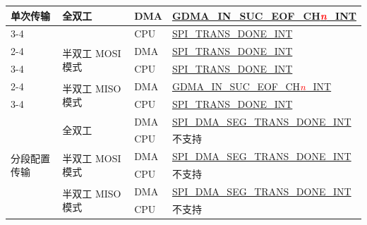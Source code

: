 \documentclass[main\_\_CN.tex]{subfiles}
\begin{document}
\begin{ThreePartTable}
\begin{longtable}[c]{|l|l|l|l|}
\multirow{6}{*}{单次传输} & \multirow{2}{*}{全双工} & DMA & \hyperref[int:GDMAINSUCEOFINT]{GDMA\_IN\_SUC\_EOF\_CH\textcolor{red}{\it{n}}\_INT} \tnote{1} \\ \cline{3-4}
&& CPU & \hyperref[int:SPITRANSDONEINT]{SPI\_TRANS\_DONE\_INT} \tnote{2}  \\ \cline{2-4}
& \multirow{2}{*}{半双工 MOSI 模式} & DMA & \hyperref[int:SPITRANSDONEINT]{SPI\_TRANS\_DONE\_INT} \\ \cline{3-4}
&& CPU & \hyperref[int:SPITRANSDONEINT]{SPI\_TRANS\_DONE\_INT}  \\ \cline{2-4}
& \multirow{2}{*}{半双工 MISO 模式} & DMA & \hyperref[int:GDMAINSUCEOFINT]{GDMA\_IN\_SUC\_EOF\_CH\textcolor{red}{\it{n}}\_INT} \\ \cline{3-4}
&& CPU & \hyperref[int:SPITRANSDONEINT]{SPI\_TRANS\_DONE\_INT} \\ \hline
\multirow{6}{*}{分段配置传输} & \multirow{2}{*}{全双工} & DMA & \hyperref[int:SPIDMASEGTRANSDONEINT]{SPI\_DMA\_SEG\_TRANS\_DONE\_INT} \tnote{3} \\ \cline{3-4}
&& CPU & 不支持       \\ \cline{2-4}
& \multirow{2}{*}{半双工 MOSI 模式} & DMA  & \hyperref[int:SPIDMASEGTRANSDONEINT]{SPI\_DMA\_SEG\_TRANS\_DONE\_INT} \\ \cline{3-4}
&& CPU           & 不支持       \\ \cline{2-4}
& \multirow{2}{*}{半双工 MISO 模式} & DMA & \hyperref[int:SPIDMASEGTRANSDONEINT]{SPI\_DMA\_SEG\_TRANS\_DONE\_INT} \\ \cline{3-4}
&& CPU & 不支持       \\ \hline
\end{longtable}
\end{ThreePartTable}
\end{document}
